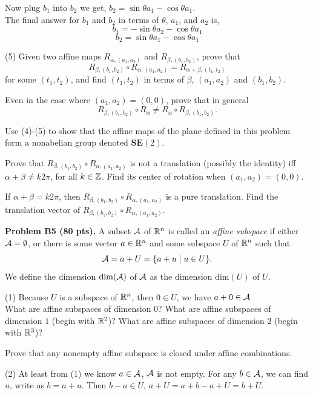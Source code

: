 \documentclass[12pt]{article}
\begin{document}
Now plug $b_1$ into $b_2$ we get, 
$b_2 = \sin \theta a_1 - \cos \theta a_1$. \\

The final answer for $b_1$ and $b_2$ in terms of $\theta$, $a_1$, and $a_2$ is, 
$$b_1 = -\sin \theta a_2 - \cos \theta a_1$$
$$b_2 = \sin \theta a_1 - \cos \theta a_1$$

\medskip
(5)
Given two affine maps $R_{\alpha, (a_1,a_2)}$ and
$R_{\beta, (b_1,b_2)}$, prove that
\[
R_{\beta, (b_1,b_2)} \circ R_{\alpha, (a_1,a_2)} =
R_{\alpha + \beta, (t_1,t_2)}
\]
for some $(t_1, t_2)$, and find $(t_1, t_2)$ in terms of
$\beta$, $(a_1,a_2)$ and $(b_1,b_2)$.


\medskip
Even in the case where $(a_1,a_2) = (0, 0)$, prove that in general
\[
R_{\beta, (b_1,b_2)} \circ R_{\alpha} \not=
R_{\alpha}  \circ R_{\beta, (b_1,b_2)}. 
\]

Use (4)-(5) to show that the affine maps of the plane defined in this
problem form a nonabelian group denoted $\mathbf{SE}(2)$.

\medskip
Prove that  $R_{\beta, (b_1,b_2)} \circ R_{\alpha, (a_1,a_2)}$ is
not a translation (possibly the identity)  iff
$\alpha + \beta \not= k 2\pi$, for all  $k\in \mathbb{Z}$.
Find its center of rotation when $(a_1, a_2) = (0, 0)$.  

\medskip
If $\alpha + \beta = k 2\pi$, then  $R_{\beta, (b_1,b_2)} \circ
R_{\alpha, (a_1,a_2)}$
is a pure translation. 
Find the translation vector 
of $R_{\beta, (b_1,b_2)} \circ R_{\alpha, (a_1,a_2)}$.


\vspace {0.5cm}\noindent
{\bf Problem B5 (80 pts).}
A subset ${\cal A}$ of $\mathbb{R}^n$ is called an {\it affine subspace\/} if
either ${\cal A} = \emptyset$, or there is some vector $a\in \mathbb{R}^n$
and some subspace $U$ of $\mathbb{R}^n$ such that
\[
{\cal A} = a + U = \{a + u \mid u \in U\}.
\]
We define the dimension $\mathrm{dim}({\cal A})$ of ${\cal A}$ as the dimension
$\mathrm{dim}(U)$ of $U$.

\medskip
(1)
Because $U$ is a subspace of $\mathbb{R}^n$, then $0 \in U$, we have $
a + 0 \in {\cal A}$
\medskip \\
What are affine subspaces of dimension $0$?
What are affine subspaces of dimension $1$ (begin with $\mathbb{R}^2$)?
What are affine subspaces of dimension $2$ (begin with $\mathbb{R}^3$)?

\medskip
Prove that any nonempty affine subspace is closed under affine
combinations.

\medskip
(2) At least from (1) we know $a \in {\cal A}$, ${\cal A}$ is not empty.
For any $b \in {\cal A}$, we can find $u$, write as $b = a + u$. Then   $b - a \in U$, $a + U = a + b - a + U = b + U$.
\end{document}
